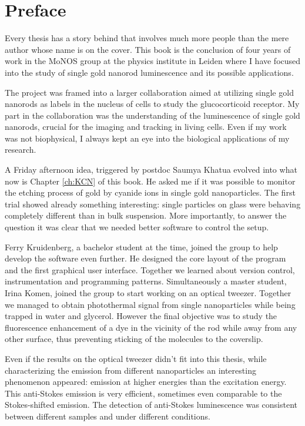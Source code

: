 \chapter*{Preface}

Every thesis has a story behind that involves much more people than the mere
author whose name is on the cover. This book is the conclusion of four years of
work in the MoNOS group at the physics institute in Leiden where I have focused
into the study of single gold nanorod luminescence and its possible applications. 

The project was framed into a larger collaboration aimed at utilizing single
gold nanorods as labels in the nucleus of cells to study the glucocorticoid
receptor. My part in the collaboration was the understanding of the luminescence
of single gold nanorods, crucial for the imaging and tracking in living cells.
Even if my work was not biophysical, I always kept an eye into the biological
applications of my research.

A Friday afternoon idea, triggered by postdoc Saumya Khatua evolved into what
now is Chapter \ref{ch:KCN} of this book. He asked me if it was possible to
monitor the etching process of gold by cyanide ions in single gold
nanoparticles. The first trial showed already something interesting: single
particles on glass were behaving completely different than in bulk suspension.
More importantly, to answer the question it was clear that we needed better
software to control the setup.

Ferry Kruidenberg, a bachelor student at the time, joined the group to help
develop the software even further. He designed the core layout of the program
and the first graphical user interface. Together we learned about version
control, instrumentation and programming patterns. Simultaneously a master
student, Irina Komen, joined the group to start working on an optical tweezer.
Together we managed to obtain photothermal signal from single nanoparticles
while being trapped in water and glycerol. However the final objective was to
study the fluorescence enhancement of a dye in the vicinity of the rod while
away from any other surface, thus preventing sticking of the molecules to the
coverslip.

Even if the results on the optical tweezer didn't fit into this thesis, while
characterizing the emission from different nanoparticles an interesting
phenomenon appeared: emission at higher energies than the excitation energy.
This anti-Stokes emission is very efficient, sometimes even comparable to the
Stokes-shifted emission. The detection of anti-Stokes luminescence was
consistent between different samples and under different conditions. 

